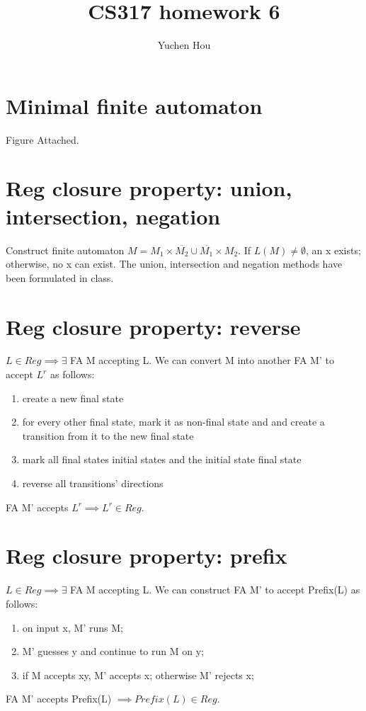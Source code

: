 \documentclass{article}
\begin{document}
\lstset{language=Java}
\title{CS317 homework 6}
\author{Yuchen Hou}
\maketitle

\section{Minimal finite automaton}
Figure Attached.

\section{Reg closure property: union, intersection, negation}
Construct finite automaton $M = M_1 \times \overline{M_2} \cup \overline{M_1}
\times M_2$. If $L(M) \neq \emptyset$, an x exists; otherwise, no x can exist.
The union, intersection and negation methods have been formulated in class.

\section{Reg closure property: reverse}
$L \in Reg \implies \exists$ FA M accepting L. We can convert M into another
FA M' to accept $L^r$ as follows:
\begin{enumerate}
  \item create a new final state
  \item for every other final state, mark it as non-final state and and create
  a transition from it to the new final state
  \item mark all final states initial states and the initial state final state
  \item reverse all transitions' directions
\end{enumerate}
FA M' accepts $L^r \implies L^r \in Reg$.

\section{Reg closure property: prefix}
$L \in Reg \implies \exists$ FA M accepting L. We can construct FA M' to accept
Prefix(L) as follows:
\begin{enumerate}
  \item on input x, M' runs M;
  \item M' guesses y and continue to run M on y;
  \item if M accepts xy, M' accepts x; otherwise M' rejects x;
\end{enumerate}
FA M' accepts Prefix(L) $\implies Prefix(L) \in Reg$.
\end{document}
